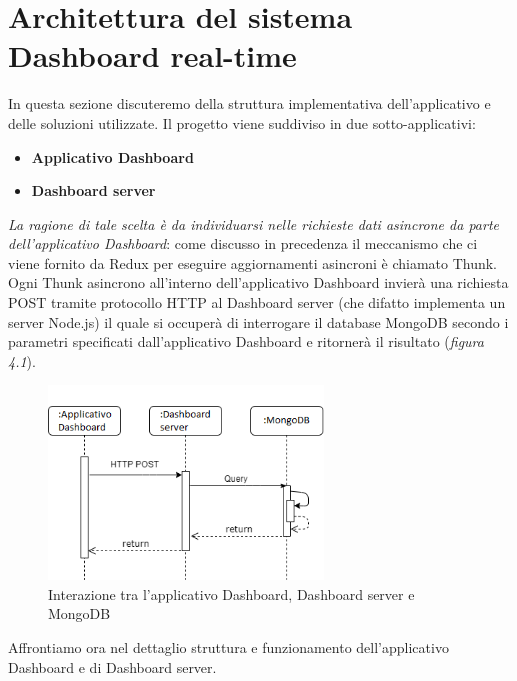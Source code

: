 \section{Architettura del sistema Dashboard real-time}
In questa sezione discuteremo della struttura implementativa dell'applicativo e delle soluzioni utilizzate.\newline
Il progetto viene suddiviso in due sotto-applicativi:
\begin{itemize}
  \item \textbf{Applicativo Dashboard}
  \item \textbf{Dashboard server}
\end{itemize}
\emph{La ragione di tale scelta è da individuarsi nelle richieste dati asincrone da parte dell'applicativo Dashboard}: come discusso in precedenza il meccanismo che ci viene fornito da Redux per eseguire aggiornamenti asincroni è chiamato Thunk.\newline
Ogni Thunk asincrono all'interno dell'applicativo Dashboard invierà una richiesta POST tramite protocollo HTTP al Dashboard server (che difatto implementa un server Node.js) il quale si occuperà di interrogare il database MongoDB secondo i parametri specificati dall'applicativo Dashboard e ritornerà il risultato (\emph{figura 4.1}).
\begin{figure}[H]
  \centering
  \includegraphics[width=0.65\textwidth]{img/diagramma sequenza dashboard server db.png}
  \caption{Interazione tra l'applicativo Dashboard, Dashboard server e MongoDB}
\end{figure}
\noindent Affrontiamo ora nel dettaglio struttura e funzionamento dell'applicativo Dashboard e di Dashboard server.
\vspace{10mm}
